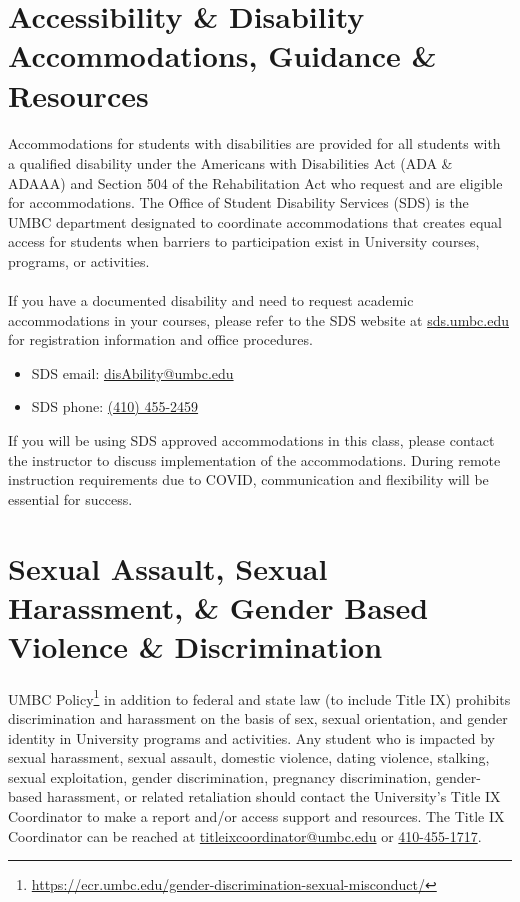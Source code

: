\documentclass[letter,10pt]{article}
\begin{document}

\section*{Accessibility \& Disability Accommodations, Guidance \& Resources}
\paragraph{}Accommodations for students with disabilities are provided for all students with a qualified disability under the Americans with Disabilities Act (ADA \& ADAAA) and Section 504 of the Rehabilitation Act who request and are eligible for accommodations. The Office of Student Disability Services (SDS) is the UMBC department designated to coordinate accommodations that creates equal access for students when barriers to participation exist in University courses, programs, or activities.

\paragraph{}If you have a documented disability and need to request academic accommodations in your courses, please refer to the SDS website at \url{sds.umbc.edu} for registration information and office procedures.
\begin{itemize}
\item SDS email: \href{mailto:disAbility@umbc.edu}{disAbility@umbc.edu}
\item SDS phone: \href{tel:+14104552459}{(410) 455-2459}
\end{itemize}
If you will be using SDS approved accommodations in this class, please contact the instructor to discuss implementation of the accommodations. During remote instruction requirements due to COVID, communication and flexibility will be essential for success.

\section*{Sexual Assault, Sexual Harassment, \& Gender Based Violence \& Discrimination}
\paragraph{}UMBC Policy\footnote{\url{https://ecr.umbc.edu/gender-discrimination-sexual-misconduct/}} in addition to federal and state law (to include Title IX) prohibits discrimination and harassment on the basis of sex, sexual orientation, and gender identity in University programs and activities. Any student who is impacted by sexual harassment, sexual assault, domestic violence, dating violence, stalking, sexual exploitation, gender discrimination, pregnancy discrimination, gender-based harassment, or related retaliation should contact the University’s Title IX Coordinator to make a report and/or access support and resources. The Title IX Coordinator can be reached at \href{mailto:titleixcoordinator@umbc.edu}{titleixcoordinator@umbc.edu} or \href{tel:+14104551717}{410-455-1717}.
\end{document}
